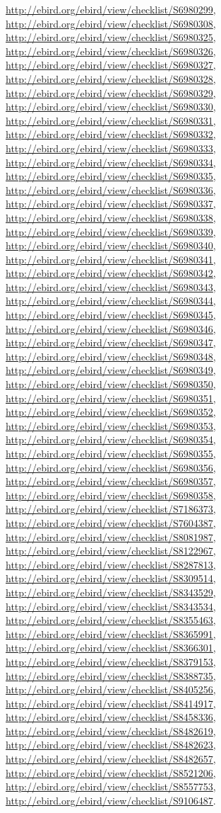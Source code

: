 \documentclass[9pt, article]{memoir}
\begin{document}
\begin{multicols}{2}
\url{http://ebird.org/ebird/view/checklist/S6980299}, 
\url{http://ebird.org/ebird/view/checklist/S6980308}, 
\url{http://ebird.org/ebird/view/checklist/S6980325}, 
\url{http://ebird.org/ebird/view/checklist/S6980326}, 
\url{http://ebird.org/ebird/view/checklist/S6980327}, 
\url{http://ebird.org/ebird/view/checklist/S6980328}, 
\url{http://ebird.org/ebird/view/checklist/S6980329}, 
\url{http://ebird.org/ebird/view/checklist/S6980330}, 
\url{http://ebird.org/ebird/view/checklist/S6980331}, 
\url{http://ebird.org/ebird/view/checklist/S6980332}, 
\url{http://ebird.org/ebird/view/checklist/S6980333}, 
\url{http://ebird.org/ebird/view/checklist/S6980334}, 
\url{http://ebird.org/ebird/view/checklist/S6980335}, 
\url{http://ebird.org/ebird/view/checklist/S6980336}, 
\url{http://ebird.org/ebird/view/checklist/S6980337}, 
\url{http://ebird.org/ebird/view/checklist/S6980338}, 
\url{http://ebird.org/ebird/view/checklist/S6980339}, 
\url{http://ebird.org/ebird/view/checklist/S6980340}, 
\url{http://ebird.org/ebird/view/checklist/S6980341}, 
\url{http://ebird.org/ebird/view/checklist/S6980342}, 
\url{http://ebird.org/ebird/view/checklist/S6980343}, 
\url{http://ebird.org/ebird/view/checklist/S6980344}, 
\url{http://ebird.org/ebird/view/checklist/S6980345}, 
\url{http://ebird.org/ebird/view/checklist/S6980346}, 
\url{http://ebird.org/ebird/view/checklist/S6980347}, 
\url{http://ebird.org/ebird/view/checklist/S6980348}, 
\url{http://ebird.org/ebird/view/checklist/S6980349}, 
\url{http://ebird.org/ebird/view/checklist/S6980350}, 
\url{http://ebird.org/ebird/view/checklist/S6980351}, 
\url{http://ebird.org/ebird/view/checklist/S6980352}, 
\url{http://ebird.org/ebird/view/checklist/S6980353}, 
\url{http://ebird.org/ebird/view/checklist/S6980354}, 
\url{http://ebird.org/ebird/view/checklist/S6980355}, 
\url{http://ebird.org/ebird/view/checklist/S6980356}, 
\url{http://ebird.org/ebird/view/checklist/S6980357}, 
\url{http://ebird.org/ebird/view/checklist/S6980358}, 
\url{http://ebird.org/ebird/view/checklist/S7186373}, 
\url{http://ebird.org/ebird/view/checklist/S7604387}, 
\url{http://ebird.org/ebird/view/checklist/S8081987}, 
\url{http://ebird.org/ebird/view/checklist/S8122967}, 
\url{http://ebird.org/ebird/view/checklist/S8287813}, 
\url{http://ebird.org/ebird/view/checklist/S8309514}, 
\url{http://ebird.org/ebird/view/checklist/S8343529}, 
\url{http://ebird.org/ebird/view/checklist/S8343534}, 
\url{http://ebird.org/ebird/view/checklist/S8355463}, 
\url{http://ebird.org/ebird/view/checklist/S8365991}, 
\url{http://ebird.org/ebird/view/checklist/S8366301}, 
\url{http://ebird.org/ebird/view/checklist/S8379153}, 
\url{http://ebird.org/ebird/view/checklist/S8388735}, 
\url{http://ebird.org/ebird/view/checklist/S8405256}, 
\url{http://ebird.org/ebird/view/checklist/S8414917}, 
\url{http://ebird.org/ebird/view/checklist/S8458336}, 
\url{http://ebird.org/ebird/view/checklist/S8482619}, 
\url{http://ebird.org/ebird/view/checklist/S8482623}, 
\url{http://ebird.org/ebird/view/checklist/S8482657}, 
\url{http://ebird.org/ebird/view/checklist/S8521206}, 
\url{http://ebird.org/ebird/view/checklist/S8557753}, 
\url{http://ebird.org/ebird/view/checklist/S9106487}.


\end{multicols}
\end{document}

